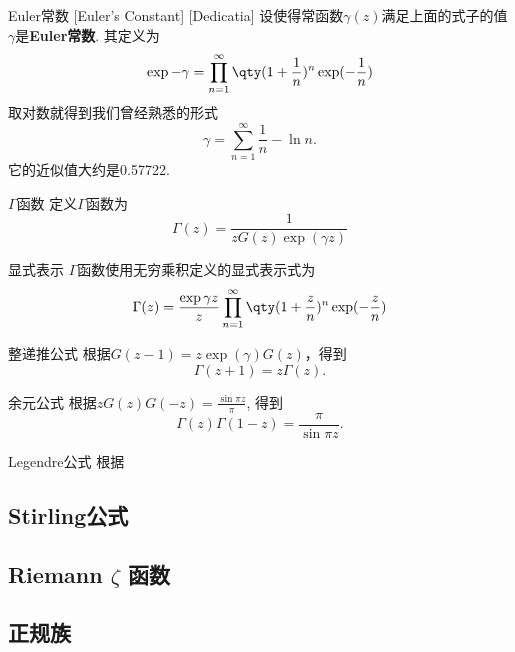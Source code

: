 \documentclass[UTF8]{ctexart}
\begin{document}
        \begin{dfn}
            [EulerConstant]
            {Euler常数}
            [Euler's Constant]
            [Dedicatia]
            设使得常函数$\gamma(z)$满足上面的式子的值$\gamma$是\textbf{Euler常数}. 其定义为
            \[\exp -\gamma=\prod_{n=1}^{\infty}\qty(1+\frac{1}{n})^n\exp(-\frac{1}{n})\]
            取对数就得到我们曾经熟悉的形式
            \[\gamma=\sum_{n=1}^{\infty}\frac{1}{n}-\ln n.\]
            它的近似值大约是0.57722.
        \end{dfn}

        \begin{dfn}
            {$\Gamma$函数}
            定义$\Gamma$函数为
            \[\Gamma(z)=\frac{1}{zG(z)\exp(\gamma z)}\]
        \end{dfn}

        \begin{dfn}
            {显式表示}
            $\Gamma$函数使用无穷乘积定义的显式表示式为
            \[\Gamma(z)=\frac{\exp\gamma z}{z}\prod_{n=1}^{\infty}\qty(1+\frac{z}{n})^n\exp(-\frac{z}{n})\]
        \end{dfn}

        \begin{ppt}
            {整递推公式}
            根据$G(z-1)=z\exp(\gamma)G(z)$，得到
            \[\Gamma(z+1)=z\Gamma(z).\]
        \end{ppt}

        \begin{ppt}
            {余元公式}
            根据$zG(z)G(-z)=\frac{\sin\pi z}{\pi}$, 得到
            \[\Gamma(z)\Gamma(1-z)=\frac{\pi}{\sin\pi z}.\]
        \end{ppt}

        \begin{ppt}
            {Legendre公式}
            根据
        \end{ppt}

    \subsection{Stirling公式}

    \subsection{Riemann  \(\zeta\)  函数}

    \subsection{正规族}
\end{document}

